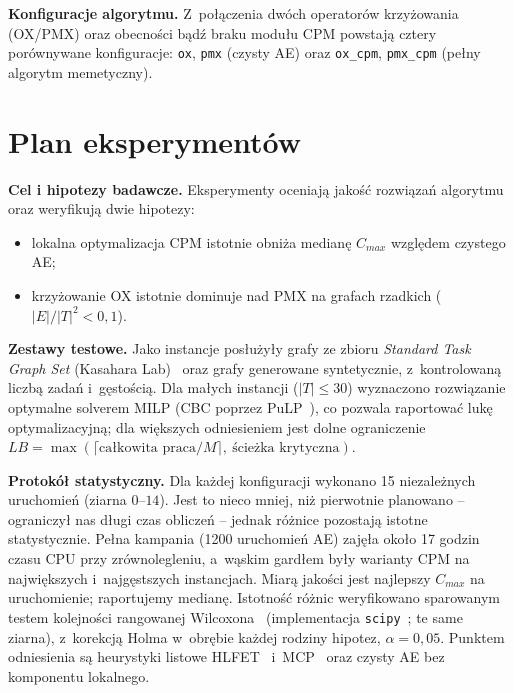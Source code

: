 \documentclass[12pt,a4paper]{article}
\newcommand{\h}[1]{\par\medskip\noindent\textbf{#1}}
\begin{document}
\h{Konfiguracje algorytmu.} Z~połączenia dwóch operatorów krzyżowania (OX/PMX) oraz obecności bądź
braku modułu CPM powstają cztery porównywane konfiguracje: \texttt{ox}, \texttt{pmx} (czysty AE)
oraz \texttt{ox\_cpm}, \texttt{pmx\_cpm} (pełny algorytm memetyczny).

\section{Plan eksperymentów}
\label{sec:eksperymenty}
\textbf{Cel i hipotezy badawcze.} Eksperymenty oceniają jakość rozwiązań algorytmu oraz weryfikują
dwie hipotezy:
\begin{itemize}[itemsep=1pt, topsep=2pt, leftmargin=3em]
    \item[(H1)] lokalna optymalizacja CPM istotnie obniża medianę $C_{max}$ względem czystego AE;
    \item[(H2)] krzyżowanie OX istotnie dominuje nad PMX na grafach rzadkich ($|E|/|T|^2 < 0{,}1$).
\end{itemize}

\h{Zestawy testowe.} Jako instancje posłużyły grafy ze zbioru \textit{Standard Task Graph Set}
(Kasahara Lab)~\cite{tobita2002} oraz grafy generowane syntetycznie, z~kontrolowaną liczbą zadań
i~gęstością. Dla małych instancji ($|T| \leq 30$) wyznaczono rozwiązanie optymalne solverem MILP
(CBC poprzez PuLP~\cite{mitchell2011}), co pozwala raportować lukę optymalizacyjną; dla większych odniesieniem jest dolne ograniczenie
$LB = \max(\lceil \text{całkowita praca}/M \rceil,\ \text{ścieżka krytyczna})$.

\h{Protokół statystyczny.} Dla każdej konfiguracji wykonano 15 niezależnych uruchomień (ziarna
$0$--$14$). Jest to nieco mniej, niż pierwotnie planowano -- ograniczył nas długi czas obliczeń --
jednak różnice pozostają istotne statystycznie. Pełna kampania (1200 uruchomień AE)
zajęła około 17 godzin czasu CPU przy zrównolegleniu, a~wąskim gardłem były warianty CPM na
największych i~najgęstszych instancjach. Miarą jakości jest najlepszy $C_{max}$
na uruchomienie; raportujemy medianę. Istotność różnic weryfikowano sparowanym testem kolejności
rangowanej Wilcoxona~\cite{wilcoxon1945} (implementacja \texttt{scipy}~\cite{virtanen2020}; te same
ziarna), z~korekcją Holma w~obrębie każdej rodziny hipotez, $\alpha = 0{,}05$. Punktem odniesienia są heurystyki listowe HLFET~\cite{adam1974}
i~MCP~\cite{wu1990} oraz czysty AE bez komponentu lokalnego.
\end{document}
